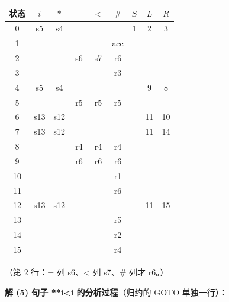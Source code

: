 \documentclass[12pt,a4paper,fontset=windows]{ctexart}
\begin{document}
\begin{center}
\renewcommand{\arraystretch}{1.3}
\begin{tabular}{c|cccccccc}
\toprule
状态 & $i$ & $*$ & $=$ & $<$ & $\#$ & $S$ & $L$ & $R$ \\
\midrule
0 & s5 & s4 &  &  &  & 1 & 2 & 3 \\
1 &  &  &  &  & acc &  &  &  \\
2 &  &  & s6 & s7 & r6 &  &  &  \\
3 &  &  &  &  & r3 &  &  &  \\
4 & s5 & s4 &  &  &  &  & 9 & 8 \\
5 &  &  & r5 & r5 & r5 &  &  &  \\
6 & s13 & s12 &  &  &  &  & 11 & 10 \\
7 & s13 & s12 &  &  &  &  & 11 & 14 \\
8 &  &  & r4 & r4 & r4 &  &  &  \\
9 &  &  & r6 & r6 & r6 &  &  &  \\
10 &  &  &  &  & r1 &  &  &  \\
11 &  &  &  &  & r6 &  &  &  \\
12 & s13 & s12 &  &  &  &  & 11 & 15 \\
13 &  &  &  &  & r5 &  &  &  \\
14 &  &  &  &  & r2 &  &  &  \\
15 &  &  &  &  & r4 &  &  &  \\
\bottomrule
\end{tabular}
\end{center}

（第 2 行：= 列 s6、< 列 s7、\# 列才 r6。）

\textbf{解 (5) 句子 {*}{*}i<i 的分析过程}（归约的 GOTO 单独一行）：
\end{document}
